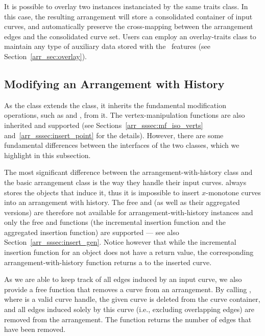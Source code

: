 It is possible to overlay two  instances 
instanciated by the same traits class. In this case, the resulting 
arrangement will store a consolidated container of input curves, and 
automatically preserve the cross-mapping between the arrangement edges 
and the consolidated curve set. Users can employ an overlay-traits class
to maintain any type of auxiliary data stored with the \dcel\ features
(see Section~\ref{arr_sec:overlay}).

\subsection{Modifying an Arrangement with History}
\label{arr_ssec:modif_traverse}
%
As the  class extends the 
class, it inherits the fundamental modification operations, such as 
 and , from it. The vertex-manipulation functions
are also inherited and supported (see Sections~\ref{arr_sssec:mf_iso_verts}
and~\ref{arr_sssec:insert_point} for the details). However, there are some 
fundamental differences between the interfaces of the two classes, which we
highlight in this subsection.

The most significant difference between the arrangement-with-history class
and the basic arrangement class is the way they handle their input curves.
 always stores the  objects
that induce it, thus it is impossible to insert $x$-monotone curves into
an arrangement with history. The free 
and  (as well as their aggregated versions)
are therefore not available for arrangement-with-history instances
and only the free  and  functions
(the incremental insertion function and the aggregated insertion function)
are supported --- see also Section~\ref{arr_sssec:insert_gen}. Notice however
that while the incremental insertion function  for
an  object  does not have a return value,
the corresponding arrangement-with-history function returns a
 to the inserted curve.

As we are able to keep track of all edges induced by an input curve, we also
provide a free function that removes a curve from an arrangement. By calling
, where  is a valid curve handle, the given curve
is deleted from the curve container, and all edges induced solely by
this curve (i.e., excluding overlapping edges) are removed from the 
arrangement. The function returns the number of edges that have been removed.

